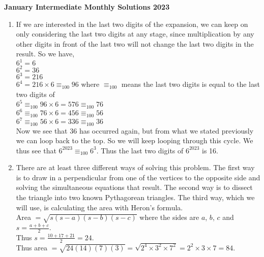 \documentclass{article}
\begin{document}
\thispagestyle{empty}

\begin{center}
  \textbf{\Large January Intermediate Monthly Solutions 2023}
  \\ \vspace{1em}
\end{center}

\bigskip

\begin{enumerate}

\item If we are interested in the last two digits of the expansion, we can keep on only considering the last two digits at any stage, since multiplication by any other digits in front of the last two will not change the last two digits in the result. So we have,\\
\newline
$6^1=6$\\
$6^2=36$\\
$6^3=216$\\
$6^4=216\times 6 \equiv_{100} 96$ \small where $\equiv_{100} $ means the last two digits is equal to the last two digits of\\ \normalsize
$6^5\equiv_{100} 96\times 6 = 576\equiv_{100} 76$\\
$6^6\equiv_{100} 76\times 6 = 456\equiv_{100} 56$\\
$6^7\equiv_{100} 56\times 6 = 336\equiv_{100} 36$\\
\newline
Now we see that 36 has occurred again, but from what we stated previously we can loop back to the top. So we will keep looping through this cycle. We thus see that $6^{2023}\equiv_{100} 6^3$.  Thus the last two digits of $6^{2023}$ is 16.

\item There are at least three different ways of solving this problem. The first way is to draw in a perpendicular from one of the vertices to the opposite side and solving the simultaneous equations that result. The second way is to dissect the triangle into two known Pythagorean triangles. The third way, which we will use, is calculating the area with Heron's formula.\\
Area $=\sqrt{s(s-a)(s-b)(s-c)}$ where the sides are $a$, $b$, $c$ and $s=\frac{a+b+c}{2}$.\\
Thus $s=\frac{10+17+21}{2}=24$.\\
Thus area $=\sqrt{24(14)(7)(3)}=\sqrt{2^4\times 3^2\times 7^2}=2^2\times 3\times 7=84$.


\end{enumerate}
\end{document}
